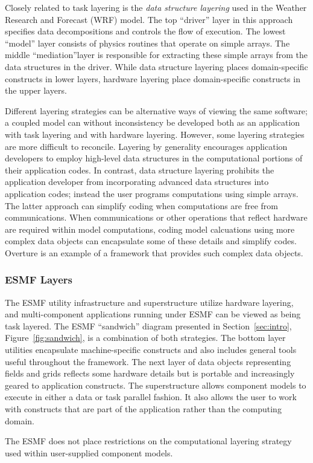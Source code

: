 Closely related to task layering is the {\it data structure layering} used 
in the Weather Research and Forecast (WRF) model.  The top ``driver'' layer 
in this approach specifies data decompositions and controls
the flow of execution.  The lowest ``model'' layer consists of physics routines that
operate on simple arrays.  The middle ``mediation''layer is responsible for 
extracting these simple arrays from the data structures in the driver.
While data structure layering places domain-specific constructs in lower layers, hardware 
layering place domain-specific constructs in the upper layers.  

Different layering strategies can be alternative ways of viewing the same
software; a coupled model can without inconsistency 
be developed both as an application with task layering and with hardware 
layering.  However, some layering strategies are more difficult to reconcile. 
Layering by generality encourages application developers to employ high-level 
data structures in the computational portions of their application codes.  In 
contrast, data structure layering prohibits the application developer from 
incorporating advanced data structures into application codes; instead the
user programs computations using simple arrays.  The latter approach can 
simplify coding
when computations are free from communications.  When communications or other
operations that reflect hardware are required within model computations, coding
model calcuations using more complex data objects can encapsulate some of 
these details and simplify codes.  Overture is an example of a framework 
that provides such complex data objects.

\subsubsection{ESMF Layers}

The ESMF utility infrastructure and superstructure utilize hardware layering, 
and multi-component applications running under ESMF can be viewed as 
being task layered.  The ESMF ``sandwich'' diagram presented in 
Section~\ref{sec:intro}, Figure~\ref{fig:sandwich}, is a combination 
of both strategies.  The bottom layer utilities encapsulate 
machine-specific constructs and also includes general tools useful throughout
the framework.  The next layer of data objects representing
fields and grids reflects some hardware details but is portable and increasingly
geared to application constructs.  The 
superstructure allows component models to execute in either a data or task 
parallel fashion.  It also allows the user to work with constructs that are part
of the application rather than the computing domain.  

The ESMF does not place restrictions on the computational layering 
strategy used within user-supplied component models.  









